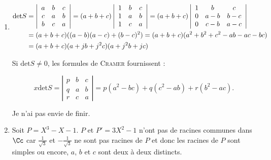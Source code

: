 {{\begin{enumerate}
Donc,

Si (($a=0$ et $b^2\neq c^2$) ou ($b=0$ et $a^2\neq c^2$) ou ($c=0$ et $a^2\neq b^2$)), le système n'a pas de solution.

Si $a=0$ et $b=c\neq 0$, l'ensemble des solutions est $\{(0,y,-\frac{y}{b^2}),\;y\in\Rr\}$ (résultats analogues pour les cas ($b=0$ et $a=c\neq 0$) et ($c=0$ et $a=b\neq0$)).

Si $a=b=c=0$, il n'y a pas de solution.
 
Si $a=0$ et $c=-b\neq0$, l'ensemble des solutions est $\{(x,y-\frac{y}{b^2}),\;(x,y)\in\Rr^2\}$ (résultats analogues pour ($b=0$ et $c=-a\neq0$) et ($c=0$ et $b=-a\neq0$).

Si $abc\neq0$ et $a+b+c=0$, le système équivaut à l'équation $a^2x+b^2y+c^2z=1$. L'ensemble  des solutions est $\{(x,y,\frac{1-a^2x-b^2y}{c^2}),\;(x,y)\in\Rr^2\}$.

\item  

\begin{align*}\ensuremath
\mbox{det}S&=\left|
\begin{array}{ccc}
a&b&c\\
c&a&b\\
b&c&a
\end{array}
\right|=(a+b+c)\left|
\begin{array}{ccc}
1&b&c\\
1&a&b\\
1&c&a
\end{array}
\right|
=(a+b+c)\left|
\begin{array}{ccc}
1&b&c\\
0&a-b&b-c\\
0&c-b&a-c
\end{array}
\right|\\
 &=(a+b+c)((a-b)(a-c)+(b-c)^2)=(a+b+c)(a^2+b^2+c^2-ab-ac-bc)\\
 &=(a+b+c)(a+jb+j^2c)(a+j^2b+jc)
\end{align*}

Si $\mbox{det}S\neq0$, les formules de \textsc{Cramer} fournissent :

$$x\mbox{det}S=\left|
\begin{array}{ccc}
p&b&c\\
q&a&b\\
r&c&a
\end{array}
\right|=p(a^2-bc)+q(c^2-ab)+r(b^2-ac).$$

Je n'ai pas envie de finir.

\item  Soit $P=X^3-X-1$. $P$ et $P'=3X^2-1$ n'ont pas de racines communes dans $\Cc$ car $\frac{1}{\sqrt{3}}$ et $-\frac{1}{\sqrt{3}}$ ne sont pas racines de $P$ et donc les racines de $P$ sont simples ou encore, $a$, $b$ et $c$ sont deux à deux distincts.


\end{enumerate}}}
